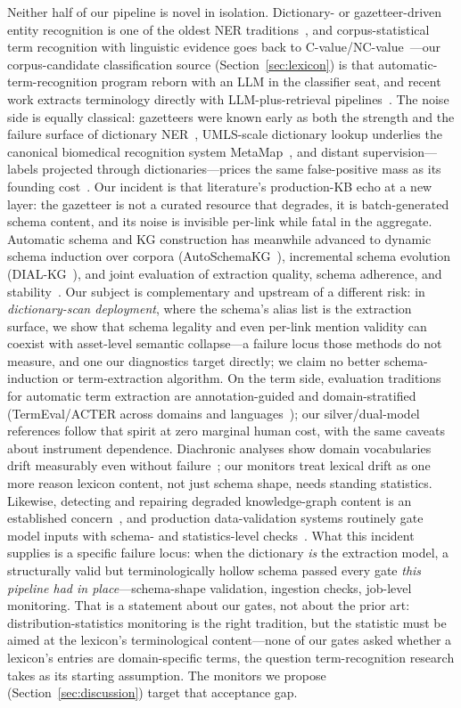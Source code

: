 \documentclass[preprint,12pt]{elsarticle}
\begin{document}
Neither half of our pipeline is novel in isolation. Dictionary- or
gazetteer-driven entity recognition is one of the oldest NER
traditions~\cite{nerSurvey}, and corpus-statistical term recognition with
linguistic evidence goes back to C-value/NC-value~\cite{cvalue}---our
corpus-candidate classification source (Section~\ref{sec:lexicon}) is that
automatic-term-recognition program reborn with an LLM in the classifier
seat, and recent work extracts terminology directly with
LLM-plus-retrieval pipelines~\cite{llmterm}. The noise side is
equally classical: gazetteers were known early as both the strength
and the failure surface of dictionary NER~\cite{mikheev}, UMLS-scale
dictionary lookup underlies the canonical biomedical recognition
system MetaMap~\cite{metamap}, and distant supervision---labels
projected through dictionaries---prices the same false-positive mass
as its founding cost~\cite{mintz}. Our incident is that literature's
production-KB echo at a new layer: the gazetteer is not a curated
resource that degrades, it is batch-generated schema content, and
its noise is invisible per-link while fatal in the aggregate. Automatic schema and KG
construction has meanwhile advanced to dynamic schema induction over
corpora (AutoSchemaKG~\cite{autoschemakg}), incremental schema evolution
(DIAL-KG~\cite{dialkg}), and joint evaluation of extraction quality,
schema adherence, and stability~\cite{schemakgeval}. Our subject is
complementary and upstream of a different risk: in \emph{dictionary-scan
deployment}, where the schema's alias list is the extraction surface,
we show that schema legality and even per-link mention validity can
coexist with asset-level semantic collapse---a failure locus those
methods do not measure, and one our diagnostics target directly; we
claim no better schema-induction or term-extraction algorithm.
On the term side, evaluation traditions for automatic term extraction
are annotation-guided and domain-stratified (TermEval/ACTER across
domains and languages~\cite{termeval}); our silver/dual-model
references follow that spirit at zero marginal human cost, with the
same caveats about instrument dependence. Diachronic analyses show
domain vocabularies drift measurably even without
failure~\cite{hamilton16}; our monitors treat lexical drift as one
more reason lexicon content, not just schema shape, needs standing
statistics. Likewise, detecting and repairing degraded
knowledge-graph content is an established concern~\cite{paulheim},
and production data-validation systems routinely gate model inputs
with schema- and statistics-level checks~\cite{tdd,deequ}. What this incident supplies is a specific failure locus: when the
dictionary \emph{is} the extraction model, a structurally valid but
terminologically hollow schema passed every gate \emph{this pipeline had
in place}---schema-shape validation, ingestion checks, job-level
monitoring. That is a statement about our gates, not about the prior
art: distribution-statistics monitoring is the right tradition, but the
statistic must be aimed at the lexicon's terminological content---none
of our gates asked whether a lexicon's entries are domain-specific
terms, the question term-recognition research takes as its starting
assumption. The monitors we propose (Section~\ref{sec:discussion})
target that acceptance gap.
\end{document}
